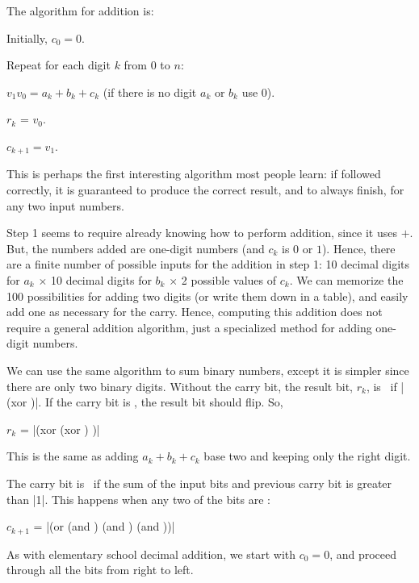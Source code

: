 \begin{schemeregion}
The algorithm for addition is:
\begin{itemtight}
\item Initially, $c_{0} = 0$.
\item Repeat for each digit $k$ from $0$ to $n$: 
\begin{enumtight}\vspace*{1.5ex}
\item $v_1v_0 = a_k + b_k + c_k$ (if there is no digit $a_k$ or $b_k$ use $0$).
\item $r_k$ = $v_0$.
\item $c_{k+1} = v_1$.
\end{enumtight}
\end{itemtight}

This is perhaps the first interesting algorithm most people learn: if followed correctly, it is guaranteed to produce the correct result, and to always finish, for any two input numbers.

Step 1 seems to require already knowing how to perform addition, since it uses $+$.  But, the numbers added are one-digit numbers (and $c_k$ is $0$ or $1$).  Hence, there are a finite number of possible inputs for the addition in step 1: 10 decimal digits for $a_k$ $\times$ 10 decimal digits for $b_k$ $\times$ 2 possible values of $c_k$.  We can memorize the 100 possibilities for adding two digits (or write them down in a table), and easily add one as necessary for the carry.  Hence, computing this addition does not require a general addition algorithm, just a specialized method for adding one-digit numbers.

We can use the same algorithm to sum binary numbers, except it is simpler since there are only two binary digits.  Without the carry bit, the result bit, $r_k$, is \bI\ if \scheme|(xor \ak \bk)|.  If the carry bit is \bI, the result bit should flip.  So,
\begin{centernospace}
$r_k$ = \scheme|(xor (xor \ak \bk) \ck)|
\end{centernospace}
This is the same as adding $a_k + b_k + c_k$ base two and keeping only the right digit.

The carry bit is \bI\ if the sum of the input bits and previous carry bit is greater than \schemeresult|1|.  This happens when any two of the bits are \bI:
\begin{centernospace}
$c_{k+1}$ = \scheme|(or (and \ak \bk) (and \ak \ck) (and \bk \ck))|
\end{centernospace}

As with elementary school decimal addition, we start with $c_{0} = 0$, and proceed through all the bits from right to left.


\end{schemeregion}
